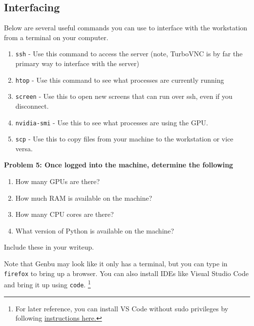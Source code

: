 \subsection*{Interfacing}
Below are several useful commands you can use to interface with the workstation from a terminal on your computer.
\begin{enumerate}
    \item \texttt{ssh} - Use this command to access the server (note, TurboVNC is by far the primary way to interface with the server)
	\item \texttt{htop} - Use this command to see what processes are currently running
	\item \texttt{screen} - Use this to open new screens that can run over ssh, even if you disconnect.
	\item \texttt{nvidia-smi} - Use this to see what processes are using the GPU.
    \item \texttt{scp} - Use this to copy files from your machine to the workstation or vice versa.
\end{enumerate}

{\bf Problem 5: Once logged into the machine, determine the following
\begin{enumerate}[label=(\alph*)]
    \item How many GPUs are there?
    \item How much RAM is available on the machine?
    \item How many CPU cores are there?
    \item What version of Python is available on the machine?
\end{enumerate}
Include these in your writeup.}

Note that Genbu may look like it only has a terminal, but you can type in \texttt{firefox} to bring up a browser. You can also install IDEs like Visual Studio Code and bring it up using \texttt{code}. \footnote{For later reference, you can install VS Code without sudo privileges by following  \href{https://huhuidong.wordpress.com/2018/12/13/how-to-install-visual-studio-code-in-linux-without-root-or-sudo/}{instructions here.} }